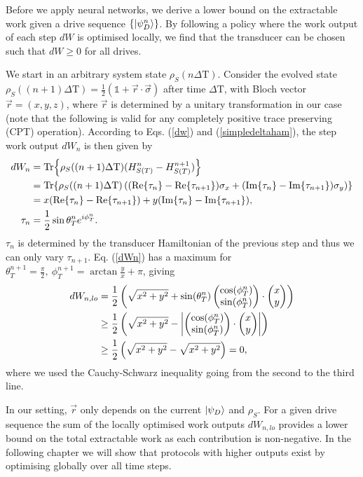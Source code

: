 Before we apply neural networks, we derive a lower bound on the extractable work given a drive sequence $\{\ket{\psi_D^n}\}$.
By following a policy where the work output of each step $dW$ is optimised locally, we find that the transducer can be chosen such that $dW \geq 0$ for all drives.

We start in an arbitrary system state $\rho_S(n \Delta \mathrm{T})$.
Consider the evolved state $\rho_S((n+1) \Delta \mathrm{T}) =\frac{1}{2} (\mathds{1} + \vec{r} \cdot \vec{\sigma})$ after time $\Delta \mathrm{T}$, with Bloch vector $\vec{r} = ( x, y, z )$, where $\vec{r}$ is determined by a unitary transformation in our case (note that the following is valid for any completely positive trace preserving (CPT) operation). According to Eqs. (\ref{dw}) and (\ref{simpledeltaham}), the step work output $dW_n$ is then given by
\begin{align} \label{dWn}
dW_n &= \Tr{\rho_S((n+1) \Delta \mathrm{T}) (H_{S(T)}^{n} - H_{S(T)}^{n+1})} \nonumber \\
&= \Tr{\rho_S((n+1) \Delta \mathrm{T}) \left((\Re{\tau_n} - \Re{\tau_{n+1}}) \sigma_x + (\Im{\tau_n} - \Im{\tau_{n+1}} ) \sigma_y \right)} \nonumber \\
&= x (\Re{\tau_n} - \Re{\tau_{n+1}}) + y (\Im{\tau_n} - \Im{\tau_{n+1}}), \\
\tau_n &= \frac{1}{2} \sin{\theta_T^n} e^{i\phi_T^n}. \nonumber
\end{align}
$\tau_n$ is determined by the transducer Hamiltonian of the previous step and thus we can only vary $\tau_{n+1}$.
Eq. (\ref{dWn}) has a maximum for $\theta_T^{n+1} = \frac{\pi}{2}, \ \phi_T^{n+1} = \arctan{\frac{y}{x}} + \pi$, giving
\begin{align*}
dW_{n, lo} &= \frac{1}{2}\left(\sqrt{x^2 + y^2} + \sin(\theta^n_T) \begin{pmatrix} \cos(\phi^n_T) \\ \sin(\phi^n_T) \end{pmatrix} \cdot \begin{pmatrix} x \\ y \end{pmatrix} \right) \\
 &\geq \frac{1}{2}\left(\sqrt{x^2 + y^2} - \abs{ \begin{pmatrix} \cos(\phi^n_T) \\ \sin(\phi^n_T) \end{pmatrix} \cdot \begin{pmatrix} x \\ y \end{pmatrix}} \right) \\
 &\geq \frac{1}{2}\left(\sqrt{x^2 + y^2} - \sqrt{x^2 + y^2} \right) = 0,
\end{align*}
where we used the Cauchy-Schwarz inequality going from the second to the third line.

In our setting, $\vec{r}$ only depends on the current $\ket{\psi_D}$ and $\rho_S$.
For a given drive sequence the sum of the locally optimised work outputs $dW_{n, lo}$ provides a lower bound on the total extractable work as each contribution is non-negative. In the following chapter we will show that protocols with higher outputs exist by optimising globally over all time steps.